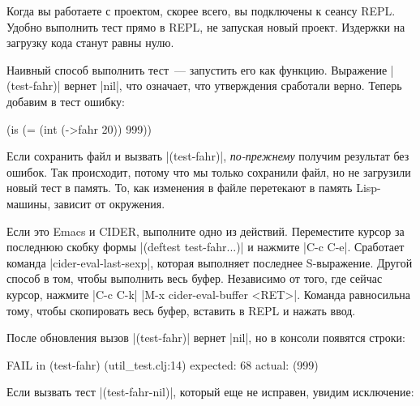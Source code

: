 Когда вы работаете с проектом, скорее всего, вы подключены к сеансу REPL. Удобно
выполнить тест прямо в REPL, не запуская новый проект. Издержки на загрузку кода
станут равны нулю.

Наивный способ выполнить тест~--- запустить его как функцию. Выражение
\spverb|(test-fahr)| вернет \spverb|nil|, что означает, что утверждения
сработали верно. Теперь добавим в тест ошибку:

\begin{english}
  \begin{clojure}
(is (= (int (->fahr 20)) 999))
  \end{clojure}
\end{english}

Если сохранить файл и вызвать \spverb|(test-fahr)|, \emph{по-прежнему} получим
результат без ошибок. Так происходит, потому что мы только сохранили файл, но не
загрузили новый тест в память. То, как изменения в файле перетекают в память
Lisp-машины, зависит от окружения.

Если это Emacs и CIDER, выполните одно из действий. Переместите курсор за
последнюю скобку формы \spverb|(deftest test-fahr...)| и нажмите \spverb|C-c C-e|.
Сработает команда \spverb|cider-eval-last-sexp|, которая выполняет последнее
S-выражение. Другой способ в том, чтобы выполнить весь буфер. Независимо от
того, где сейчас курсор, нажмите \spverb|C-c C-k| \spverb|M-x cider-eval-buffer <RET>|.
Команда равносильна тому, чтобы скопировать весь буфер, вставить в REPL и нажать ввод.

После обновления вызов \spverb|(test-fahr)| вернет \spverb|nil|, но в консоли появятся строки:

\begin{english}
  \begin{clojure}
FAIL in (test-fahr) (util_test.clj:14)
expected: 68
  actual: (999)
  \end{clojure}
\end{english}

Если вызвать тест \spverb|(test-fahr-nil)|, который еще не исправен, увидим
исключение:

\begin{english}
\end{english}

